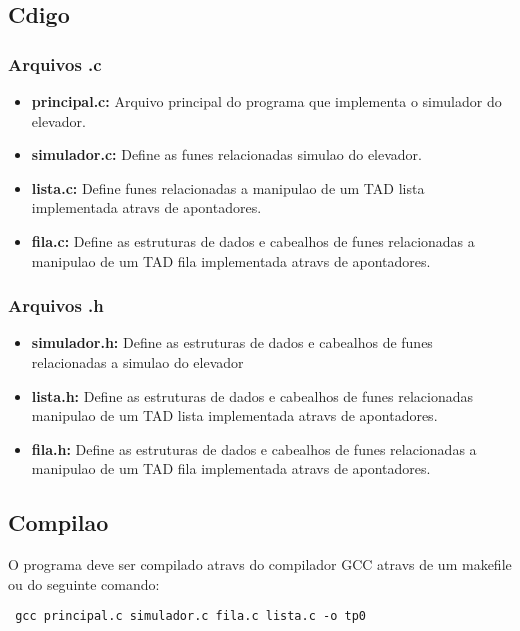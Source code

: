 \documentclass[12pt]{article}
\begin{document}
\subsection{Cdigo}

\subsubsection{Arquivos .c}

\begin{itemize}
\item \textbf{principal.c:} Arquivo principal do programa que implementa o simulador do elevador.
\item \textbf{simulador.c:} Define as funes relacionadas  simulao do elevador.
\item \textbf{lista.c:} Define funes relacionadas a manipulao de um TAD lista implementada atravs de apontadores.
\item \textbf{fila.c:}  Define as estruturas de dados e cabealhos de funes relacionadas a manipulao de um TAD fila implementada atravs de apontadores.
\end{itemize}

\subsubsection{Arquivos .h}

\begin{itemize}
\item \textbf{simulador.h:}  Define as estruturas de dados e cabealhos de funes relacionadas a simulao do elevador
\item \textbf{lista.h:} Define as estruturas de dados e cabealhos de funes relacionadas  manipulao de um TAD lista implementada atravs de apontadores.
\item \textbf{fila.h:} Define as estruturas de dados e cabealhos de funes relacionadas a manipulao de um TAD fila implementada atravs de apontadores.

\end{itemize}

\subsection{Compilao}

O programa deve ser compilado atravs do compilador GCC atravs de um makefile ou do seguinte comando:

\begin{footnotesize}
\begin{verbatim} gcc principal.c simulador.c fila.c lista.c -o tp0 \end{verbatim}
\end{footnotesize}
\end{document}
